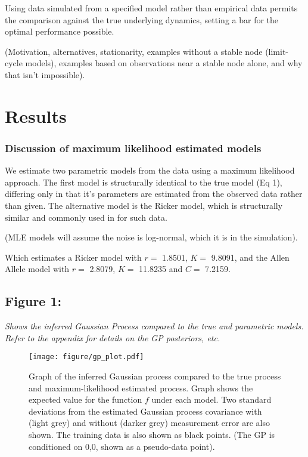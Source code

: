 \documentclass[author-year, review]{elsarticle} %
\makeatletter
\def\maxwidth{\ifdim\Gin@nat@width>\linewidth\linewidth
\else\Gin@nat@width\fi}
\let\Oldincludegraphics\includegraphics
\renewcommand{\includegraphics}[1]{\Oldincludegraphics[width=\maxwidth]{#1}}
\makeatother
\begin{document}
Using data simulated from a specified model rather than empirical data
permits the comparison against the true underlying dynamics, setting a
bar for the optimal performance possible.

(Motivation, alternatives, stationarity, examples without a stable node
(limit-cycle models), examples based on observations near a stable node
alone, and why that isn't impossible).

\section{Results}

\subsubsection{Discussion of maximum likelihood estimated models}

We estimate two parametric models from the data using a maximum
likelihood approach. The first model is structurally identical to the
true model (Eq 1), differing only in that it's parameters are estimated
from the observed data rather than given. The alternative model is the
Ricker model, which is structurally similar and commonly used in for
such data.

(MLE models will assume the noise is log-normal, which it is in the
simulation).

Which estimates a Ricker model with $r =$ 1.8501, $K =$ 9.8091, and the
Allen Allele model with $r =$ 2.8079, $K =$ 11.8235 and $C =$ 7.2159.

\subsection{Figure 1:}

\emph{Shows the inferred Gaussian Process compared to the true and
parametric models. Refer to the appendix for details on the GP
posteriors, etc.}

\begin{figure}[htbp]
\centering
\texttt{[image: figure/gp\_plot.pdf]}
\caption{Graph of the inferred Gaussian process compared to the true
process and maximum-likelihood estimated process. Graph shows the
expected value for the function $f$ under each model. Two standard
deviations from the estimated Gaussian process covariance with (light
grey) and without (darker grey) measurement error are also shown. The
training data is also shown as black points. (The GP is conditioned on
0,0, shown as a pseudo-data point).}
\end{figure}
\end{document}
